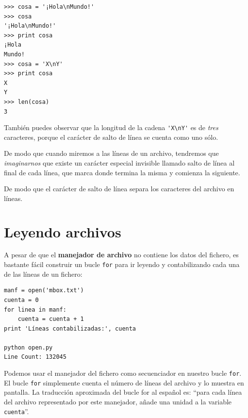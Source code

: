 \beforeverb
\begin{verbatim}
>>> cosa = '¡Hola\nMundo!'
>>> cosa
'¡Hola\nMundo!'
>>> print cosa
¡Hola
Mundo!
>>> cosa = 'X\nY'
>>> print cosa
X
Y
>>> len(cosa)
3
\end{verbatim}
\afterverb
%

También puedes observar que la longitud de la cadena \verb"'X\nY'" es de \emph{tres}
caracteres, porque el carácter de salto de línea se cuenta como uno sólo.

De modo que cuando miremos a las líneas de un archivo, tendremos que \emph{imaginarnos}
que existe un carácter especial invisible llamado salto de línea al
final de cada línea, que marca donde termina la misma y comienza la siguiente.


De modo que el carácter de salto de línea separa los caracteres
del archivo en líneas.

\section{Leyendo archivos}

A pesar de que el {\bf manejador de archivo} no contiene los datos del fichero,
es bastante fácil construir un bucle {\tt for} para ir leyendo
y contabilizando cada una de las líneas de un fichero:

\beforeverb
\begin{verbatim}
manf = open('mbox.txt')
cuenta = 0
for linea in manf:
    cuenta = cuenta + 1
print 'Líneas contabilizadas:', cuenta

python open.py 
Line Count: 132045
\end{verbatim}
\afterverb
%
Podemos usar el manejador del fichero como secuenciador en nuestro bucle {\tt for}.
El bucle {\tt for} simplemente cuenta el número de líneas del
archivo y lo muestra en pantalla. La traducción aproximada del bucle for
al español es: ``para cada línea del archivo representado por este
manejador, añade una unidad a la variable {\tt cuenta}''.

